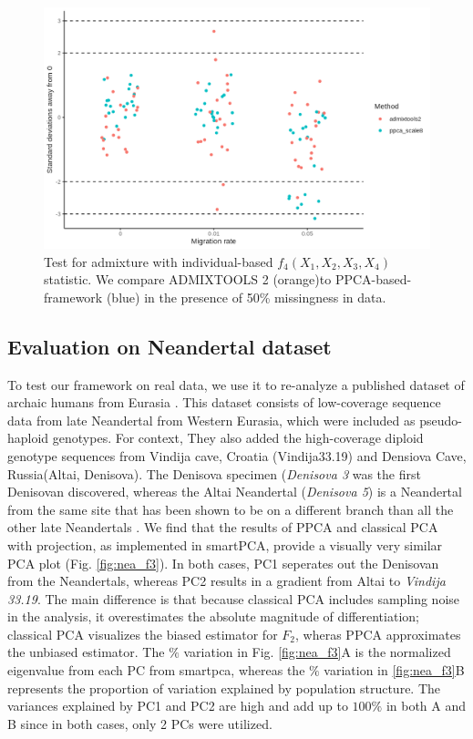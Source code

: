 \documentclass[12pt, letterpaper]{article}
\begin{document}
\begin{figure}[ht!]
    \includegraphics[width=16.5cm]{plots/simfiles/AvgFolder/Ne1000/split_times1000/npop10_nind100/missing0.5/plots_8/hypothesis_test_comparison.png}
    \centering
         \caption{Test for admixture with individual-based $f_4(X_1, X_2, X_3, X_4)$ statistic. We compare ADMIXTOOLS 2 (orange)to PPCA-based-framework (blue) in the presence of 50\% missingness in data.}
    \label{fig:admixture}
\end{figure}

\subsection{Evaluation on Neandertal dataset}

To test our framework on real data, we use it to re-analyze a published dataset of archaic humans from Eurasia \cite{hajdinjak_reconstructing_2018}. This dataset consists of  low-coverage sequence data from late Neandertal from Western Eurasia, which were included as pseudo-haploid genotypes. For context, They also added the high-coverage diploid genotype sequences from Vindija cave, Croatia (Vindija33.19)\citep{prufer_high-coverage_2017} and Densiova Cave, Russia(Altai, Denisova)\citep{prufer_complete_2014, meyer2012}. The Denisova specimen (\textit{Denisova 3} was the first Denisovan discovered, whereas the Altai Neandertal (\textit{Denisova 5}) is a Neandertal from the same site that has been shown to be on a different branch than all the other late Neandertals \citep{prufer_complete_2014, prufer_high-coverage_2017}. We find that the results of PPCA and classical PCA with projection, as implemented in smartPCA, provide a visually very similar PCA plot (Fig. \ref{fig:nea_f3}). In both cases, PC1 seperates out the Denisovan from the Neandertals, whereas PC2 results in a gradient from Altai to \textit{Vindija 33.19}. 
The main difference is that because classical PCA includes sampling noise in the analysis, it overestimates the absolute magnitude of differentiation; classical PCA visualizes the biased estimator for $F_2$, wheras PPCA approximates the unbiased estimator. The $\%$ variation in Fig. \ref{fig:nea_f3}A is the normalized eigenvalue from each PC from smartpca, whereas the $\%$ variation in \ref{fig:nea_f3}B represents the proportion of variation explained by population structure. The variances explained by PC1 and PC2 are high and add up to $100\%$ in both A and B since in both cases, only 2 PCs were utilized.
\end{document}
